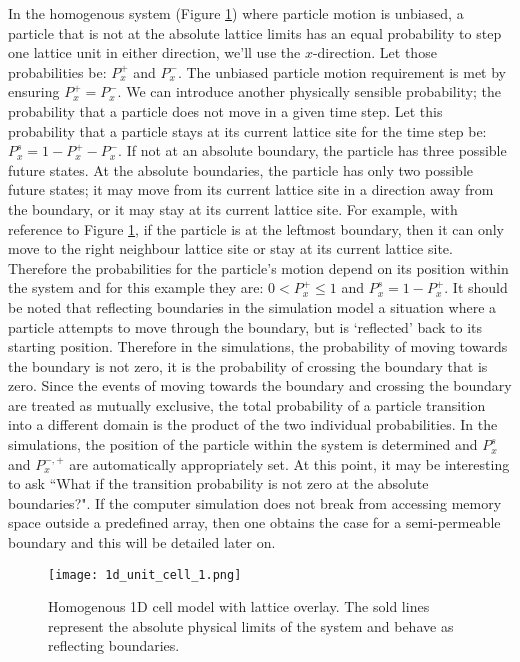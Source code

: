 	In the homogenous system (Figure \ref{fig:1d_unit_cell_1.png}) where particle motion is unbiased, a particle that is not at the absolute lattice limits has an equal probability to step one lattice unit in either direction, we'll use the $ x $-direction. Let those probabilities be: $ P_x^+ $ and $ P_x^- $. The unbiased particle motion requirement is met by ensuring $ P_x^+ = P_x^- $. We can introduce another physically sensible probability; the probability that a particle does not move in a given time step. Let this probability that a particle stays at its current lattice site for the time step be: $ P_x^s = 1 - P_x^+ - P_x^- $. If not at an absolute boundary, the particle has three possible future states. At the absolute boundaries, the particle has only two possible future states; it may move from its current lattice site in a direction away from the boundary, or it may stay at its current lattice site. For example, with reference to Figure \ref{fig:1d_unit_cell_1.png}, if the particle is at the leftmost boundary, then it can only move to the right neighbour lattice site or stay at its current lattice site. Therefore the probabilities for the particle's motion depend on its position within the system and for this example they are: $ 0 < P_x^+ \leq 1 $ and $ P_x^s = 1 - P_x^+ $. It should be noted that reflecting boundaries in the simulation model a situation where a particle attempts to move through the boundary, but is `reflected' back to its starting position. Therefore in the simulations, the probability of moving towards the boundary is not zero, it is the probability of crossing the boundary that is zero. Since the events of moving towards the boundary and crossing the boundary are treated as mutually exclusive, the total probability of a particle transition into a different domain is the product of the two individual probabilities. In the simulations, the position of the particle within the system is determined and $ P_x^s $ and $ P_x^{-,+} $ are automatically appropriately set. At this point, it may be interesting to ask ``What if the transition probability is not zero at the absolute boundaries?". If the computer simulation does not break from accessing memory space outside a predefined array, then one obtains the case for a semi-permeable boundary and this will be detailed later on.
	
	\begin{figure}[h]
		\centering
		\texttt{[image: 1d\_unit\_cell\_1.png]}
		\caption{Homogenous 1D cell model with lattice overlay. The sold lines represent the absolute physical limits of the system and behave as reflecting boundaries.}
		\label{fig:1d_unit_cell_1.png}
		\end{figure}	
	
